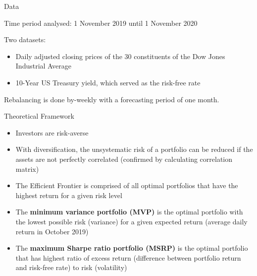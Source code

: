 \documentclass{beamer}
\begin{document}
\begin{frame}{Data}

Time period analysed: 1 November 2019 until 1 November 2020

\vspace{0.5 cm}

Two datasets:

\begin{itemize}
    \item Daily adjusted closing prices of the 30 constituents of the Dow Jones Industrial Average
    \item 10-Year US Treasury yield, which served as the risk-free rate
\end{itemize}

\vspace{0.5cm}

Rebalancing is done by-weekly with a forecasting period of one month.

\end{frame}

\begin{frame}{Theoretical Framework}
\begin{itemize}
    \item Investors are risk-averse \cite{1lindquist2022advanced}
    \item With diversification, the unsystematic risk of a portfolio can be reduced if the assets are not perfectly correlated (confirmed by calculating correlation matrix) \cite{mangram2013simplified}
    \item The Efficient Frontier is comprised of all optimal portfolios that have the highest return for a given risk level \cite{mangram2013simplified}
    \item The \textbf{minimum variance portfolio (MVP)} is the optimal portfolio with the lowest possible risk (variance) for a given expected return (average daily return in October 2019) \cite{bodnar2024constructing}
    \item The \textbf{maximum Sharpe ratio portfolio (MSRP)} is the optimal portfolio that has highest ratio of excess return (difference between portfolio return and risk-free rate) to risk (volatility) \cite{bodnar2024constructing}

\end{itemize}

\end{frame}
\end{document}
